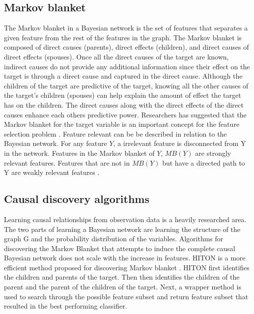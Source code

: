 \subsection{Markov blanket}
\indent The Markov blanket in a Bayesian network is the set of features that separates a given feature from the rest of the features in the graph. The Markov blanket is composed of direct causes (parents), direct effects (children), and direct causes of direct effects (spouses). Once all the direct causes of the target are known, indirect causes do not provide any additional information since their effect on the target is through a direct cause and captured in the direct cause. Although the children of the target are predictive of the target, knowing all the other causes of the target’s children (spouses) can help explain the amount of effect the target has on the children. The direct causes along with the direct effects of the direct causes enhance each others predictive power. Researchers has suggested that the Markov blanket for the target variable is an important concept for the feature selection problem \cite{MBforCL}. Feature relevant can be be described in relation to the Bayesian network. For any feature \(Y\), a irrelevant feature is disconnected from Y in the network. Features in the Markov blanket of \(Y\), \(MB(Y)\) are strongly relevant features. Features that are not in \(MB(Y)\) but have a directed path to Y are weakly relevant features \cite{Clopinet}. 

\subsection{Causal discovery algorithms}

\indent Learning causal relationships from observation data is a heavily researched area. The two parts of learning a Bayesian network are learning the structure of the graph G and the probability distribution of the variables. Algorithms for discovering the Markov Blanket that attempts to induce the complete causal Bayesian network does not scale with the increase in features. HITON is a more efficient method proposed for discovering Markov blanket \cite{HITON}. HITON first identifies the children and parents of the target. Then then identifies the children of the parent and the parent of the children of the target. Next, a wrapper method is used to search through the possible feature subset and return feature subset that resulted in the best performing classifier. 

